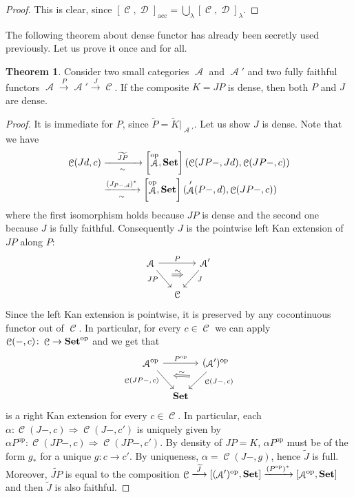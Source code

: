 \documentclass[a4paper,11pt,oneside,openany]{scrbook}
\newcommand{\catname}[1]{{\normalfont\textbf{#1}}}
\newcommand{\Set}{\catname{Set}}
\DeclareMathOperator{\op}{\text{op}}
\DeclareMathOperator{\A}{\mathcal{A}}
\DeclareMathOperator{\C}{\mathcal{C}}
\DeclareMathOperator{\D}{\mathcal{D}}
\theoremstyle{definition}
\newtheorem{thm}{Theorem}[section] %
\theoremstyle{definition}
\begin{document}
\begin{proof}
	This is clear, since $\displaystyle\left[\C,\D\right]_\text{acc}=\bigcup_\lambda\left[\C,\D\right]_\lambda$.
\end{proof}
The following theorem about dense functor has already been secretly used previously. Let us prove it once and for all. 
\begin{thm}
	Consider two small categories $\A$ and $\A'$ and two fully faithful functors $\A\xrightarrow{P}\A'\xrightarrow{J}\C$. If the composite $K=JP$ is dense, then both $P$ and $J$ are dense.
\end{thm}
\begin{proof}
	It is immediate for $P$, since $\widetilde{P}=\widetilde{K}|_{\A'}$. Let us show $J$ is dense. Note that we have 
	\begin{align*}
	\C(Jd,c)&\xrightarrow[\sim]{\hspace*{4mm}\widetilde{JP}\hspace*{4mm}}\left[\A^{\op}, \Set\right](\C(JP-,Jd),\C(JP-,c))\\
	&\xrightarrow[\sim]{(J_{P-,d})^*}\left[\A^{\op}, \Set\right](\A'(P-,d),\C(JP-,c))
	\end{align*}
	where the first isomorphism holds because $JP$ is dense and the second one because $J$ is fully faithful. Consequently $J$ is the pointwise left Kan extension of $JP$ along $P$:
	\[
	\begin{tikzcd}[column sep=small]
	\A\ar[rr, "P"]\ar[dr, swap, "JP" near start, ""{name=JP, below}]
	&& \A'\ar[dl, "J" near start, ""{name=J, below}] \\
	& \C
	\ar[Rightarrow, shorten <= .6em, shorten >= .6em, shift left=1.5ex, "\sim", from=JP, to=J] 
	\end{tikzcd}
	\]
	Since the left Kan extension is pointwise, it is preserved by any cocontinuous functor out of $\C$. In particular, for every $c\in\C$ we can apply $\C(-,c)\colon\C\to\Set^{\op}$ and we get that
	\[
	\begin{tikzcd}[column sep=tiny]
	\A^{\op}\ar[rr, "P^{\op}"]\ar[dr, swap, "\C(JP-\text{, }\hspace*{-.5mm}c)"near start, ""{name=JP, below}]
	&& (\A')^{\op}\ar[dl, "\C(J-\text{, }\hspace*{-.5mm} c)" near start, ""{name=J, below}] \\
	& \Set
	\ar[Leftarrow, shorten <= .6em, shorten >= .6em, shift left=1.5ex, "\sim", from=JP, to=J] 
	\end{tikzcd}
	\]
	is a right Kan extension for every $c\in\C$. In particular, each $\alpha\colon\C(J-,c)\Rightarrow\C(J-,c')$ is uniquely given by $\alpha P^{\op}\colon\C(JP-,c)\Rightarrow\C(JP-,c')$. By density of $JP=K$, $\alpha P^{\op}$ must be of the form $g_*$ for a unique $g\colon c\to c'$. By uniqueness, $\alpha=\C(J-,g)$, hence $\widetilde{J}$ is full. Moreover, $\widetilde{JP}$ is equal to the composition $\C\xlongrightarrow{\widetilde{J}} \left[(\A')^{\op},\Set\right]\xrightarrow{(P^{\op})^*}\left[\A^{\op},\Set\right]$ and then $\widetilde{J}$ is also faithful.
\end{proof}
\end{document}
